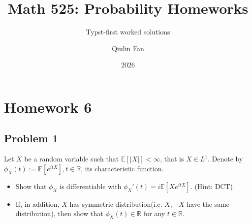 \documentclass{qlnotes-export}
\title{Math 525: Probability Homeworks}
\subtitle{Typst-first worked solutions}
\author{Qiulin Fan}
\date{2026}
\begin{document}
\mainmatter
\chapter{Homework 6}\label{homework-6}

\section{Problem 1}\label{problem-1-6}

Let \(X\) be a random variable such that \({\mathbb{E}}\left\lbrack |X| \right\rbrack < \infty\), that is \(X \in L^{1}\). Denote by \(\phi_{X}(t) := {\mathbb{E}}\left\lbrack e^{itX} \right\rbrack,t \in {\mathbb{R}}\), its characteristic function.

\begin{itemize}
\item
  Show that \(\phi_{X}\) is differentiable with \(\phi_{X}'(t) = i{\mathbb{E}}\left\lbrack {Xe^{itX}} \right\rbrack\). (Hint: DCT)
\item
  If, in addition, \(X\) has symmetric distribution(i.e. \(X, - X\) have the same distribution), then show that \(\phi_{X}(t) \in {\mathbb{R}}\) for any \(t \in {\mathbb{R}}\).
\end{itemize}
\end{document}

